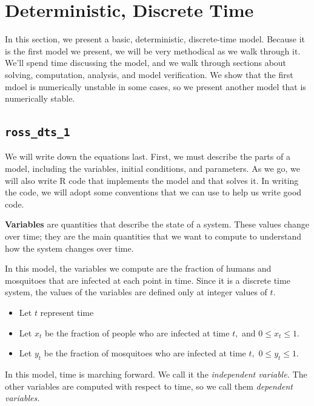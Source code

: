 \documentclass[
]{book}
\begin{document}
\section{Deterministic, Discrete Time}\label{dtsRoss}

In this section, we present a basic, deterministic, discrete-time model. Because it is the first model we present, we will be very methodical as we walk through it. We'll spend time discussing the model, and we walk through sections about solving, computation, analysis, and model verification. We show that the first mdoel is numerically unstable in some cases, so we present another model that is numerically stable.

\subsection{\texorpdfstring{\texttt{ross\_dts\_1}}{ross\_dts\_1}}\label{ross_dts_1}

We will write down the equations last. First, we must describe the parts of a model, including the variables, initial conditions, and parameters. As we go, we will also write R code that implements the model and that solves it. In writing the code, we will adopt some conventions that we can use to help us write good code.

\textbf{Variables} are quantities that describe the state of a system. These values change over time; they are the main quantities that we want to compute to understand how the system changes over time.

In this model, the variables we compute are the fraction of humans and mosquitoes that are infected at each point in time. Since it is a discrete time system, the values of the variables are defined only at integer values of \(t.\)

\begin{itemize}
\item
  Let \(t\) represent time
\item
  Let \(x_t\) be the fraction of people who are infected at time \(t,\) and \(0 \leq x_t \leq 1.\)
\item
  Let \(y_t\) be the fraction of mosquitoes who are infected at time \(t,\) \(0 \leq y_t \leq 1.\)
\end{itemize}

In this model, time is marching forward. We call it the \emph{independent variable.} The other variables are computed with respect to time, so we call them \emph{dependent variables.}
\end{document}
